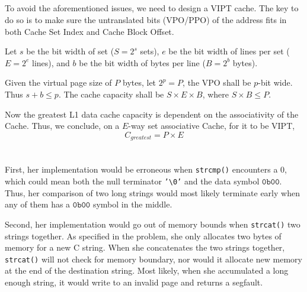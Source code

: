 \documentclass[12pt]{article}
\begin{document}
\subsection{}

To avoid the aforementioned issues, we need to design a VIPT cache. The key to do so is to make sure the untranslated bits (VPO/PPO) of the address fits in both Cache Set Index and Cache Block Offset. 

Let $s$ be the bit width of set ($S = 2^s$ sets), $e$ be the bit width of lines per set ($E = 2^e$ lines), and $b$ be the bit width of bytes per line ($B = 2^b$ bytes).

Given the virtual page size of $P$ bytes, let $2^p = P$, the VPO shall be $p$-bit wide. Thus $s + b \leq p$. The cache capacity shall be $S \times E \times B$, where $S \times B \leq P$.

Now the greatest L1 data cache capacity is dependent on the associativity of the Cache. Thus, we conclude, on a $E$-way set associative Cache, for it to be VIPT,
$$ C_{greatest} = P \times E$$

\newpage
\section{}

\subsection{}
First, her implementation would be erroneous when \texttt{strcmp()} encounters a 0, which could mean both the null terminator \texttt{'\textbackslash0'} and the data symbol $\mathtt{0b00}$. Thus, her comparison of two long strings would most likely terminate early when any of them has a $\mathtt{0b00}$ symbol in the middle.

Second, her implementation would go out of memory bounds when \texttt{strcat()} two strings together. As specified in the problem, she only allocates two bytes of memory for a new C string. When she concatenates the two strings together, \texttt{strcat()} will not check for memory boundary, nor would it allocate new memory at the end of the destination string. Most likely, when she accumulated a long enough string, it would write to an invalid page and returns a segfault.

\subsection{}
\end{document}
